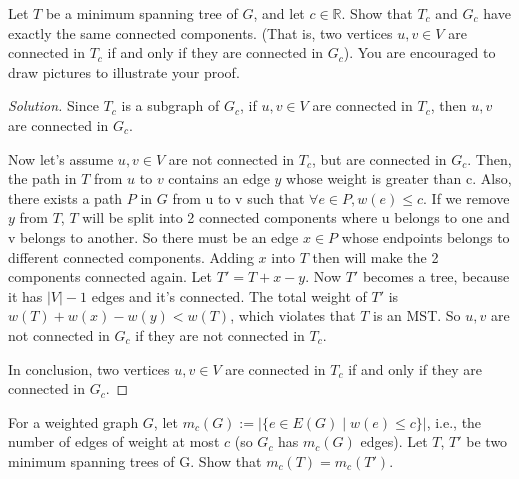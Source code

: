 


    \maketitle

    \begin{thm}{}{}
        Let $T$ be a minimum spanning tree of $G$, and let $c\in \mathbb{R}$.
        Show that $T_c$ and $G_c$ have exactly the same connected components. (That is, two vertices $u,v\in V$ are connected in $T_c$ if and only if they are connected in $G_c$).
        You are encouraged to draw pictures to illustrate your proof.
    \end{thm}
    \begin{proof}[Solution]
        Since $T_c$ is a subgraph of $G_c$, if $u,v\in V$ are connected in $T_c$, then $u,v$ are connected in $G_c$.
        
        Now let's assume $u,v\in V$ are not connected in $T_c$, but are connected in $G_c$.
        Then, the path in $T$ from $u$ to $v$ contains an edge $y$ whose weight is greater than c.
        Also, there exists a path $P$ in $G$ from u to v such that $\forall e\in P, w(e)\leq c$.
        If we remove $y$ from $T$, $T$ will be split into 2 connected components where u belongs to one and v belongs to another.
        So there must be an edge $x\in P$ whose endpoints belongs to different connected components.
        Adding $x$ into $T$ then will make the 2 components connected again.
        Let $T'=T+x-y$.
        Now $T'$ becomes a tree, because it has $|V|-1$ edges and it's connected.
        The total weight of  $T'$ is $w(T)+w(x)-w(y)<w(T)$, which violates that $T$ is an MST\@.
        So $u,v$ are not connected in $G_c$ if they are not connected in $T_c$.

        In conclusion, two vertices $u,v\in V$ are connected in $T_c$ if and only if they are connected in $G_c$.
    \end{proof}

    \newpage
    
    \begin{thm}{}{}
        For a weighted graph $G$, let $m_c(G) := | \{e \in E(G) \mid w(e) \leq c\}|$, i.e., the number of edges of weight at most $c$ (so $G_c$ has $m_c(G)$ edges). Let $T$, $T'$ be two minimum spanning trees of G. Show that $m_c(T) = m_c(T')$.
    \end{thm}
    
